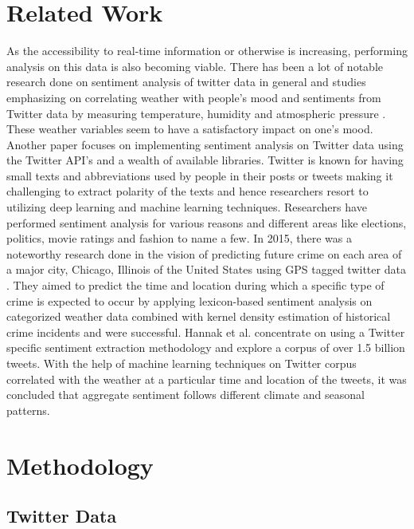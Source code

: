 \documentclass[a4paper,10pt]{article}
\begin{document}
\section{Related Work}

As the accessibility to real-time information or otherwise is increasing, performing analysis on this data is also becoming viable. There has been a lot of notable research done on sentiment analysis of twitter data in general and studies emphasizing on correlating weather with people’s mood and sentiments from Twitter data by measuring temperature, humidity and atmospheric pressure . These weather variables seem to have a satisfactory impact on one’s mood. Another paper  focuses on implementing sentiment analysis on Twitter data using the Twitter API’s and a wealth of available libraries. Twitter is known for having small texts and abbreviations used by people in their posts or tweets making it challenging to extract polarity of the texts and hence researchers resort to utilizing deep learning and machine learning techniques.
Researchers have performed sentiment analysis for various reasons and different areas like elections, politics, movie ratings and fashion to name a few. In 2015, there was a noteworthy research done in the vision of predicting future crime on each area of a major city, Chicago, Illinois of the United States using GPS tagged twitter data . They aimed to predict the time and location during which a specific type of crime is expected to occur by applying lexicon-based sentiment analysis on categorized weather data combined with kernel density estimation of historical crime incidents and were successful. Hannak et al.  concentrate on using a Twitter specific sentiment extraction methodology and explore a corpus of over 1.5 billion tweets. With the help of machine learning techniques on Twitter corpus correlated with the weather at a particular time and location of the tweets, it was concluded that aggregate sentiment follows different climate and seasonal patterns.

\section{Methodology}

\subsection{Twitter Data}
\end{document}
